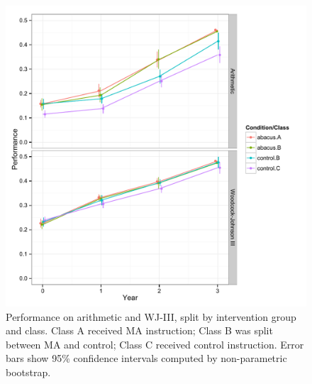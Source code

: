 \documentclass[11pt]{article}
\begin{document}
\begin{figure}[H]
\begin{center}
\includegraphics[width=5.5in]{figures/math1_class.pdf}
\end{center}
\caption{Performance on arithmetic and WJ-III, split by intervention group and class. Class A received MA instruction; Class B was split between MA and control; Class C received control instruction. Error bars show 95\% confidence intervals computed by non-parametric bootstrap.}
\label{fig:mathclass1}
\end{figure}
\end{document}
